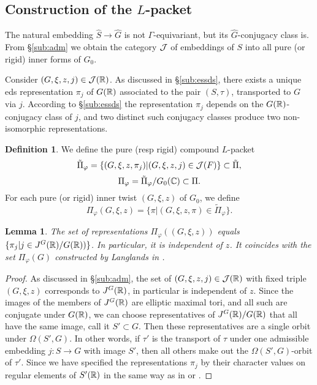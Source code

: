 \documentclass{article}
\newtheorem{lem}[thm]{Lemma}
\theoremstyle{definition}
\newtheorem{dfn}[thm]{Definition}
\numberwithin{equation}{section}
\renewcommand{\-}{\hyp{}}
\newcommand{\warn}[1]{{\leavevmode\color{red}[#1]}}
\begin{document}
\subsection{Construction of the $L$\-packet}

The natural embedding $\hat S \to \hat G$ is not $\Gamma$-equivariant, but its $\hat G$-conjugacy class is. From \S\ref{sub:adm} we obtain the category $\mathcal{J}$ of embeddings of $S$ into all pure (or rigid) inner forms of $G_0$.

Consider $(G,\xi,z,j) \in \mathcal{J}(\mathbb{R})$. As discussed in \S\ref{sub:essds}, there exists a unique eds representation $\pi_j$ of $G(\mathbb{R})$ associated to the pair $(S,\tau)$, transported to $G$ via $j$. According to \S\ref{sub:essds} the representation $\pi_j$ depends on the $G(\mathbb{R})$-conjugacy class of $j$, and two distinct such conjugacy classes produce two non-isomorphic representations.




\begin{dfn}
We define the pure (resp rigid) compound $L$\-packet
\[ \tilde\Pi_\varphi = \{(G,\xi,z,\pi_j)|(G,\xi,z,j) \in \mathcal{J}(F)\} \subset \tilde\Pi, \]
\[ \Pi_\varphi=\tilde\Pi_\varphi/G_0(\mathbb{C}) \subset \Pi. \]
For each pure (or rigid) inner twist $(G,\xi,z)$ of $G_0$, we define
\[ \Pi_\varphi(G,\xi,z)=\{\pi | (G,\xi,z,\pi) \in \tilde\Pi_\varphi\}. \]
\end{dfn}

\begin{lem}
The set of representations $\Pi_\varphi((G,\xi,z))$ equals $\{\pi_j|j \in J^G(\mathbb{R})/G(\mathbb{R}))\}$. In particular, it is independent of $z$. It coincides with the set $\Pi_\varphi(G)$ constructed by Langlands in \cite[\S3]{Lan89}.
\end{lem}
\begin{proof}
	As discussed in \S\ref{sub:adm}, the set of $(G,\xi,z,j) \in \mathcal{J}(\mathbb{R})$ with fixed triple $(G,\xi,z)$ corresponds to $J^G(\mathbb{R})$, in particular is independent of $z$. Since the images of the members of $J^G(\mathbb{R})$ are elliptic maximal tori, and all such are conjugate under $G(\mathbb{R})$, we can choose representatives of $J^G(\mathbb{R})/G(\mathbb{R})$ that all have the same image, call it $S' \subset G$. Then these representatives are a single orbit under $\Omega(S',G)$. In other words, if $\tau'$ is the transport of $\tau$ under one admissible embedding $j : S \to G$ with image $S'$, then all others make out the $\Omega(S',G)$-orbit of $\tau'$. Since we have specified the representations $\pi_j$ by their character values on regular elements of $S'(\mathbb{R})$ in the same way as in \cite[\S3]{Lan89} or \cite[\S4]{AV16}.
\end{proof}
\end{document}
